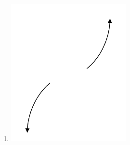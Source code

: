 \documentclass[10pt]{article}
\begin{document}
\begin{enumerate}
{\begin{multicols}{2}
\begin{enumerate}[label=\Alph*.]
		\item \begin{center} \includegraphics[scale=0.5]{endBehaviorPositiveOdd}\end{center}
	\end{enumerate}	
\end{multicols}
}

\newpage


\end{enumerate}
\end{document}
